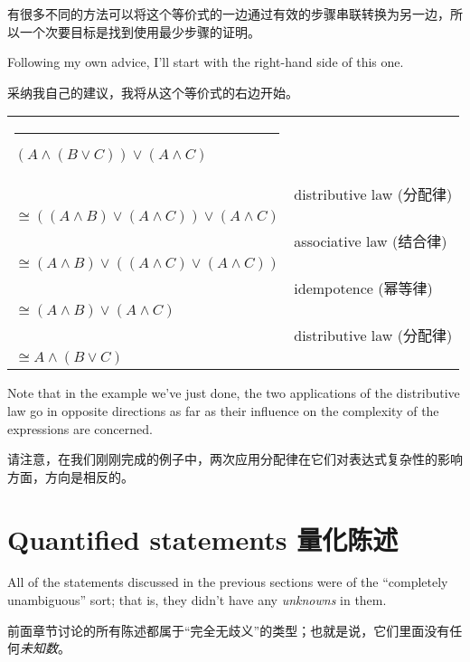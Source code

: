 有很多不同的方法可以将这个等价式的一边通过有效的步骤串联转换为另一边，所以一个次要目标是找到使用最少步骤的证明。

Following my own advice, I'll start 
with the right-hand side of this one.

采纳我自己的建议，我将从这个等价式的右边开始。

\medskip

\begin{center}
\begin{tabular}{p{2in}p{2in}}
\rule{10pt}{0pt} $(A \land (B \lor C)) \lor (A \land C)$ & \\
 & distributive law (分配律)\\
$\cong  ((A \land B) \lor (A \land C)) \lor (A \land C)$ & \\
 & associative law (结合律)\\
$\cong  (A \land B) \lor ((A \land C) \lor (A \land C))$ & \\
 & idempotence (幂等律) \\
$\cong (A \land B) \lor (A \land C) $ & \\
 & distributive law (分配律)\\
$\cong A \land (B \lor C)$ & \\
\end{tabular}
\end{center}
\medskip

Note that in the example we've just done, the two applications
of the distributive law go in opposite directions as far as their
influence on the complexity of the expressions are concerned.

请注意，在我们刚刚完成的例子中，两次应用分配律在它们对表达式复杂性的影响方面，方向是相反的。

\clearpage






\newpage

\section{Quantified statements 量化陈述}
\label{sec:quant}

All of the statements discussed in the previous sections were of the 
``completely unambiguous'' sort;
that is, they didn't have any {\em unknowns}  
in them.

前面章节讨论的所有陈述都属于“完全无歧义”的类型；也就是说，它们里面没有任何{\em 未知数}。

